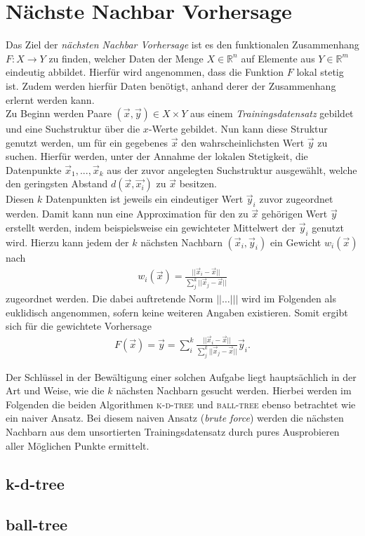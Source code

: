 \section{Nächste Nachbar Vorhersage}
Das Ziel der \textit{nächsten Nachbar Vorhersage} ist es den funktionalen Zusammenhang $F : X \rightarrow Y$ zu finden, welcher Daten der Menge $X \in \mathbb{R}^n$ auf Elemente aus $Y \in \mathbb{R}^m$ eindeutig abbildet. Hierfür wird angenommen, dass die Funktion $F$ lokal stetig ist. Zudem werden hierfür Daten benötigt, anhand derer der Zusammenhang erlernt werden kann.\\
Zu Beginn werden Paare $(\vec{x},\vec{y}) \in X \times Y$ aus einem \textit{Trainingsdatensatz} gebildet und eine Suchstruktur über die $x$-Werte gebildet. Nun kann diese Struktur genutzt werden, um für ein gegebenes $\vec{x}$ den wahrscheinlichsten Wert $\vec{y}$ zu suchen. Hierfür werden, unter der Annahme der lokalen Stetigkeit, die Datenpunkte $\vec{x}_1, ..., \vec{x}_k$ aus der zuvor angelegten Suchstruktur ausgewählt, welche den geringsten Abstand $d(\vec{x}, \vec{x_i})$ zu $\vec{x}$ besitzen.\\
Diesen $k$ Datenpunkten ist jeweils ein eindeutiger Wert $\vec{y}_i$ zuvor zugeordnet werden. Damit kann nun eine Approximation für den zu $\vec{x}$ gehörigen Wert $\vec{y}$ erstellt werden, indem beispielsweise ein gewichteter Mittelwert der $\vec{y}_i$ genutzt wird. Hierzu kann jedem der $k$ nächsten Nachbarn $(\vec{x}_i, \vec{y}_i)$ ein Gewicht $w_i(\vec{x})$ nach
\begin{align*}
w_i(\vec{x}) = \frac{||\vec{x}_i-\vec{x}||}{\sum_j^k ||\vec{x}_j-\vec{x}||}
\end{align*}
zugeordnet werden. Die dabei auftretende Norm $||\ldots |||$ wird im Folgenden als euklidisch angenommen, sofern keine weiteren Angaben existieren. Somit ergibt sich für die gewichtete Vorhersage
\begin{align}
F(\vec{x}) = \vec{y} = \sum^k_i \frac{||\vec{x}_i-\vec{x}||}{\sum_j^k ||\vec{x}_j-\vec{x}||} \vec{y}_i.
\end{align}

Der Schlüssel in der Bewältigung einer solchen Aufgabe liegt hauptsächlich in der Art und Weise, wie die $k$ nächsten Nachbarn gesucht werden. Hierbei werden im Folgenden die beiden Algorithmen \textsc{k-d-tree} und \textsc{ball-tree} ebenso betrachtet wie ein naiver Ansatz. Bei diesem naiven Ansatz (\textit{brute force}) werden die nächsten Nachbarn aus dem unsortierten Trainingsdatensatz durch pures Ausprobieren aller Möglichen Punkte ermittelt.

\subsection{k-d-tree}

\subsection{ball-tree}